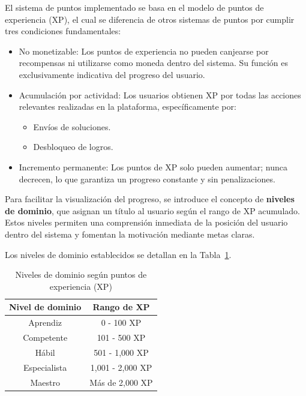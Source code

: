 El sistema de puntos implementado se basa en el modelo de puntos de experiencia (XP), el cual se diferencia de otros sistemas de puntos por cumplir tres condiciones fundamentales:

\begin{itemize}
    \item No monetizable: Los puntos de experiencia no pueden canjearse por recompensas ni utilizarse como moneda dentro del sistema. Su función es exclusivamente indicativa del progreso del usuario.
    \item Acumulación por actividad: Los usuarios obtienen XP por todas las acciones relevantes realizadas en la plataforma, específicamente por:
    \begin{itemize}
        \item Envíos de soluciones.
        \item Desbloqueo de logros.
    \end{itemize}
    \item Incremento permanente: Los puntos de XP solo pueden aumentar; nunca decrecen, lo que garantiza un progreso constante y sin penalizaciones.
\end{itemize}

Para facilitar la visualización del progreso, se introduce el concepto de \textbf{niveles de dominio}, que asignan un título al usuario según el rango de XP acumulado. Estos niveles permiten una comprensión inmediata de la posición del usuario dentro del sistema y fomentan la motivación mediante metas claras.

Los niveles de dominio establecidos se detallan en la Tabla~\ref{tab:niveles_dominio}.

\begin{table}[h]
\centering
\small
\begin{tabular}{cc}
\toprule
\textbf{Nivel de dominio} & \textbf{Rango de XP} \\
\midrule
Aprendiz     & 0 - 100 XP \\
\midrule
Competente   & 101 - 500 XP \\
\midrule
Hábil        & 501 - 1,000 XP \\
\midrule
Especialista & 1,001 - 2,000 XP \\
\midrule
Maestro      & Más de 2,000 XP \\
\bottomrule
\end{tabular}
\caption{Niveles de dominio según puntos de experiencia (XP)}
\label{tab:niveles_dominio}
\end{table}

